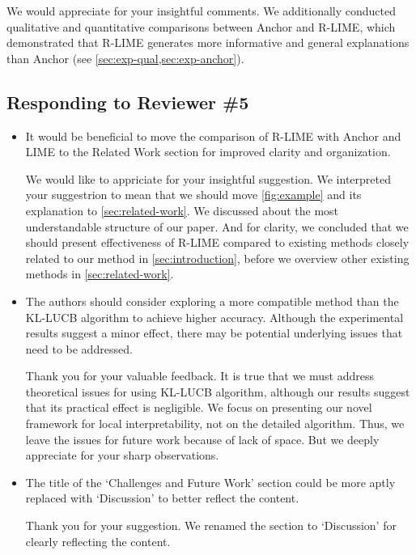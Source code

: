 \documentclass[runningheads]{llncs}
\begin{document}
\begin{mycomment}
  We would appreciate for your insightful comments.
  We additionally conducted qualitative and quantitative comparisons
  between Anchor and R-LIME,
  which demonstrated that R-LIME generates more informative and
  general explanations than Anchor (see \cref{sec:exp-qual,sec:exp-anchor}).
\end{mycomment}

\subsection*{Responding to Reviewer \#5}
\begin{itemize}
  \setlength{\itemsep}{15pt}
  \item It would be beneficial to move the comparison of R-LIME with Anchor
        and LIME to the Related Work section for improved clarity and
        organization.

        \begin{mycomment}
          We would like to appriciate for your insightful suggestion.
          We interpreted your suggestrion to mean that we should move
          \cref{fig:example} and its explanation to \cref{sec:related-work}.
          We discussed about the most understandable structure of our paper.
          And for clarity, we concluded that we should present effectiveness
          of R-LIME compared to existing methods closely related to our method
          in \cref{sec:introduction},
          before we overview other existing methods in \cref{sec:related-work}.
        \end{mycomment}

  \item The authors should consider exploring a more compatible method than the
        KL-LUCB algorithm to achieve higher accuracy. Although the experimental
        results suggest a minor effect, there may be potential underlying issues
        that need to be addressed.

        \begin{mycomment}
          Thank you for your valuable feedback.
          It is true that we must address theoretical issues for using
          KL-LUCB algorithm, although our results suggest that its practical
          effect is negligible.
          We focus on presenting our novel framework for local interpretability,
          not on the detailed algorithm.
          Thus, we leave the issues for future work because of lack of space.
          But we deeply appreciate for your sharp observations.
        \end{mycomment}

  \item The title of the `Challenges and Future Work' section could be more
        aptly replaced with `Discussion' to better reflect the content.

        \begin{mycomment}
          Thank you for your suggestion. We renamed the section to `Discussion'
          for clearly reflecting the content.
        \end{mycomment}
\end{itemize}
\end{document}
